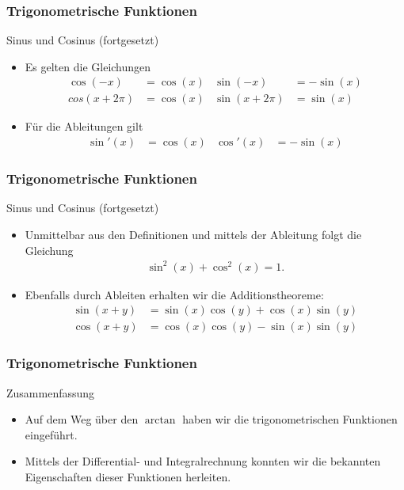 \documentclass{beamer}
\newcommand{\ue}{\"u}
\newcommand{\mytitle}{Trigonometrische Funktionen}
\begin{document}
\begin{frame}\frametitle{\mytitle}
	\begin{block}{Sinus und Cosinus (fortgesetzt)}
		\begin{itemize}
			\item Es gelten die Gleichungen
				\begin{align*}
					\cos(-x)&=\cos(x)&\sin(-x)&=-\sin(x)\\
					cos(x+2\pi)&=\cos(x)&\sin(x+2\pi)&=\sin(x)
				\end{align*}
			\item F\ue r die Ableitungen gilt
				\begin{align*}
					\sin'(x)&=\cos(x)&\cos'(x)&=-\sin(x)
				\end{align*}
		\end{itemize}
	\end{block}
\end{frame}

\begin{frame}\frametitle{\mytitle}
	\begin{block}{Sinus und Cosinus (fortgesetzt)}
		\begin{itemize}
			\item Unmittelbar aus den Definitionen und mittels der Ableitung folgt die Gleichung
				\begin{align*}
					\sin^2(x)+\cos^2(x)=1.
				\end{align*}
			\item Ebenfalls durch Ableiten erhalten wir die \alert{Additionstheoreme}:
				\begin{align*}
					\sin(x+y)&=\sin(x)\cos(y)+\cos(x)\sin(y)\\
					\cos(x+y)&=\cos(x)\cos(y)-\sin(x)\sin(y)
				\end{align*}
		\end{itemize}
	\end{block}
\end{frame}

\begin{frame}\frametitle{\mytitle}
	\begin{block}{Zusammenfassung}
		\begin{itemize}
			\item Auf dem Weg \ue ber den $\arctan$ haben wir die trigonometrischen Funktionen eingef\ue hrt.
			\item Mittels der Differential- und Integralrechnung konnten wir die bekannten Eigenschaften dieser Funktionen herleiten.
		\end{itemize}
	\end{block}
\end{frame}
\end{document}
